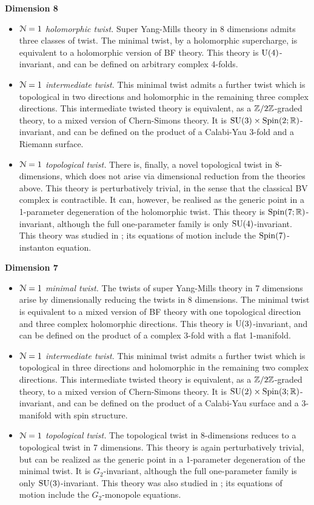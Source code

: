 \documentclass[10pt, oneside]{article}
\begin{document}
\textbf{Dimension 8}
\begin{itemize}
 \item \emph{$\mathcal{N}=1$ holomorphic twist.} Super Yang-Mills theory in 8 dimensions admits three classes of twist.  The minimal twist, by a holomorphic supercharge, is equivalent to a holomorphic version of BF theory.  This theory is $\mathrm{U}(4)$-invariant, and can be defined on arbitrary complex 4-folds.
 \item \emph{$\mathcal{N}=1$ intermediate twist.} This minimal twist admits a further twist which is topological in two directions and holomorphic in the remaining three complex directions.  This intermediate twisted theory is equivalent, as a $\mathbb Z/2\mathbb Z$-graded theory, to a mixed version of Chern-Simons theory.  It is $\mathrm{SU}(3) \times \mathrm{Spin}(2;\mathbb R)$-invariant, and can be defined on the product of a Calabi-Yau 3-fold and a Riemann surface.
 \item \emph{$\mathcal{N}=1$ topological twist.}  There is, finally, a novel topological twist in 8-dimensions, which does not arise via dimensional reduction from the theories above.  This theory is perturbatively trivial, in the sense that the classical BV complex is contractible.  It can, however, be realised as the generic point in a 1-parameter degeneration of the holomorphic twist.  This theory is $\mathrm{Spin}(7;\mathbb R)$-invariant, although the full one-parameter family is only $\mathrm{SU}(4)$-invariant.  This theory was studied in \cite{AcharyaOLoughlinSpence,BaulieuKannoSinger}; its equations of motion include the $\mathrm{Spin}(7)$-instanton equation.
\end{itemize}

\textbf{Dimension 7}
\begin{itemize}
 \item \emph{$\mathcal{N}=1$ minimal twist.} The twists of super Yang-Mills theory in 7 dimensions arise by dimensionally reducing the twists in 8 dimensions.  The minimal twist is equivalent to a mixed version of BF theory with one topological direction and three complex holomorphic directions.  This theory is $\mathrm{U}(3)$-invariant, and can be defined on the product of a complex 3-fold with a flat 1-manifold.
 \item \emph{$\mathcal{N}=1$ intermediate twist.} This minimal twist admits a further twist which is topological in three directions and holomorphic in the remaining two complex directions.  This intermediate twisted theory is equivalent, as a $\mathbb Z/2\mathbb Z$-graded theory, to a mixed version of Chern-Simons theory.  It is $\mathrm{SU}(2) \times \mathrm{Spin}(3;\mathbb R)$-invariant, and can be defined on the product of a Calabi-Yau surface and a 3-manifold with spin structure.
 \item \emph{$\mathcal{N}=1$ topological twist.} The topological twist in 8-dimensions reduces to a topological twist in 7 dimensions.  This theory is again perturbatively trivial, but can be realized as the generic point in a 1-parameter degeneration of the minimal twist.  It is $G_2$-invariant, although the full one-parameter family is only $\mathrm{SU}(3)$-invariant.  This theory was also studied in \cite{AcharyaOLoughlinSpence}; its equations of motion include the $G_2$-monopole equations.
\end{itemize}
\end{document}
